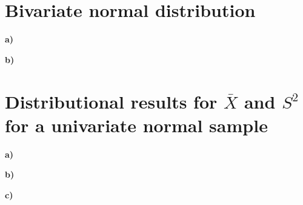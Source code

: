 \documentclass[11pt, a4paper, english]{NTNUoving}
\begin{document}
%

\section*{Bivariate normal distribution}
\textbf{a)}

\textbf{b)}



\section*{Distributional results for $\bar{X}$ and $S^2$ for a univariate normal sample}
\textbf{a)}

\textbf{b)}

\textbf{c)}

\end{document}
